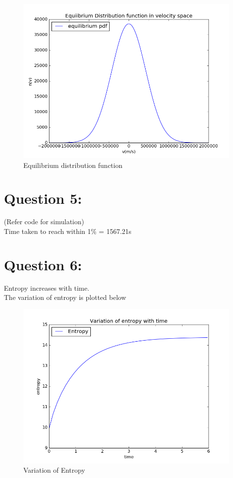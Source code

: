 \documentclass[11pt, a4paper]{article}
\begin{document}
\begin{figure}[H]
 \centering
 \includegraphics[scale = 0.6]{Eqb_pdf.png}
 \caption{Equilibrium distribution function}
\end{figure}

\section{Question 5:}
(Refer code for simulation) \\
Time taken to reach within 1\% = 1567.21s

\section{Question 6:}
Entropy increases with time. \\
The variation of entropy is plotted below
\begin{figure}[H]
 \centering
 \includegraphics[scale = 0.6]{Entropy.png}
 \caption{Variation of Entropy}
\end{figure}
\end{document}
